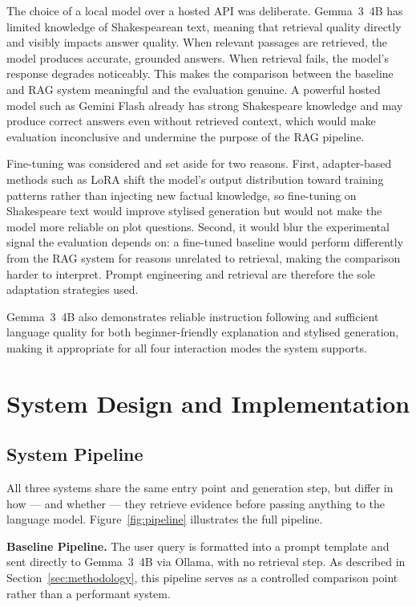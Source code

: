 \documentclass[10pt,conference]{IEEEtran}
\begin{document}
The choice of a local model over a hosted API was deliberate. Gemma~3~4B has limited
knowledge of Shakespearean text, meaning that retrieval quality directly and visibly impacts
answer quality. When relevant passages are retrieved, the model produces accurate, grounded
answers. When retrieval fails, the model's response degrades noticeably. This makes the
comparison between the baseline and RAG system meaningful and the evaluation genuine. A
powerful hosted model such as Gemini Flash already has strong Shakespeare knowledge and may
produce correct answers even without retrieved context, which would make evaluation
inconclusive and undermine the purpose of the RAG pipeline.

Fine-tuning was considered and set aside for two reasons. First, adapter-based methods such as LoRA shift the model's output distribution toward training patterns rather than injecting new factual knowledge, so fine-tuning on Shakespeare text would improve stylised generation but would not make the model more reliable on plot questions. Second, it would blur the experimental signal the evaluation depends on: a fine-tuned baseline would perform differently from the RAG system for reasons unrelated to retrieval, making the comparison harder to interpret. Prompt engineering and retrieval are therefore the sole adaptation strategies used.
 
Gemma~3~4B also demonstrates reliable instruction following and sufficient language quality
for both beginner-friendly explanation and stylised generation, making it appropriate for all
four interaction modes the system supports.

\section{System Design and Implementation}
\label{sec:system}



\subsection{System Pipeline}

All three systems share the same entry point and generation step, but
differ in how --- and whether --- they retrieve evidence before passing
anything to the language model. Figure~\ref{fig:pipeline} illustrates
the full pipeline.

\textbf{Baseline Pipeline.}
The user query is formatted into a prompt template and sent directly to
Gemma~3~4B via Ollama, with no retrieval step. As described in
Section~\ref{sec:methodology}, this pipeline serves as a controlled
comparison point rather than a performant system.
\end{document}

